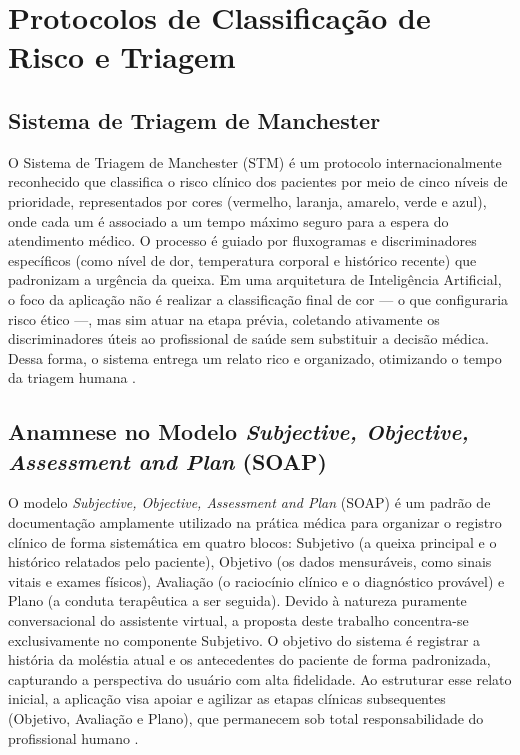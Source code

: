 \section{Protocolos de Classificação de Risco e Triagem}

\subsection{Sistema de Triagem de Manchester}

O Sistema de Triagem de Manchester (STM) é um protocolo internacionalmente reconhecido que classifica o risco clínico dos pacientes por meio de cinco níveis de prioridade, representados por cores (vermelho, laranja, amarelo, verde e azul), onde cada um é associado a um tempo máximo seguro para a espera do atendimento médico. O processo é guiado por fluxogramas e discriminadores específicos (como nível de dor, temperatura corporal e histórico recente) que padronizam a urgência da queixa. Em uma arquitetura de Inteligência Artificial, o foco da aplicação não é realizar a classificação final de cor — o que configuraria risco ético —, mas sim atuar na etapa prévia, coletando ativamente os discriminadores úteis ao profissional de saúde sem substituir a decisão médica. Dessa forma, o sistema entrega um relato rico e organizado, otimizando o tempo da triagem humana \cite{richens2020,shortliffe1975}.

\subsection{Anamnese no Modelo \textit{Subjective, Objective, Assessment and Plan} (SOAP)}

O modelo \textit{Subjective, Objective, Assessment and Plan} (SOAP) é um padrão de documentação amplamente utilizado na prática médica para organizar o registro clínico de forma sistemática em quatro blocos: Subjetivo (a queixa principal e o histórico relatados pelo paciente), Objetivo (os dados mensuráveis, como sinais vitais e exames físicos), Avaliação (o raciocínio clínico e o diagnóstico provável) e Plano (a conduta terapêutica a ser seguida). Devido à natureza puramente conversacional do assistente virtual, a proposta deste trabalho concentra-se exclusivamente no componente Subjetivo. O objetivo do sistema é registrar a história da moléstia atual e os antecedentes do paciente de forma padronizada, capturando a perspectiva do usuário com alta fidelidade. Ao estruturar esse relato inicial, a aplicação visa apoiar e agilizar as etapas clínicas subsequentes (Objetivo, Avaliação e Plano), que permanecem sob total responsabilidade do profissional humano \cite{richens2020,shortliffe1975}.

